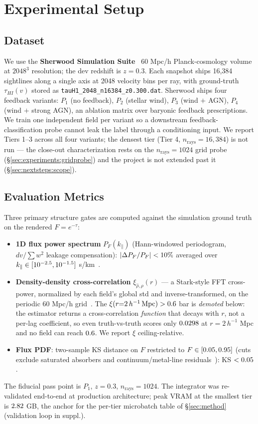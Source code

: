 \section{Experimental Setup}
\label{sec:experiments}

\subsection{Dataset}
We use the \textbf{Sherwood Simulation Suite}~\cite{bolton2017sherwood} 60 Mpc/h Planck-cosmology volume at $2048^3$ resolution; the dev redshift is $z = 0.3$. Each snapshot ships 16{,}384 sightlines along a single axis at 2048 velocity bins per ray, with ground-truth $\tau_{HI}(v)$ stored as \texttt{tauH1\_2048\_n16384\_z0.300.dat}. Sherwood ships four feedback variants: $P_1$ (no feedback), $P_2$ (stellar wind), $P_3$ (wind $+$ AGN), $P_4$ (wind $+$ strong AGN), an ablation matrix over baryonic feedback prescriptions. We train one independent field per variant so a downstream feedback-classification probe cannot leak the label through a conditioning input. We report Tiers 1--3 across all four variants; the densest tier (Tier 4, $n_{\text{rays}}=16{,}384$) is not run --- the close-out characterization rests on the $n_{\text{rays}}=1024$ grid probe (\S\ref{sec:experiments:gridprobe}) and the project is not extended past it (\S\ref{sec:nextsteps:scope}).

\subsection{Evaluation Metrics}
Three primary structure gates are computed against the simulation ground truth on the rendered $F=e^{-\tau}$:
\begin{itemize}
    \item \textbf{1D flux power spectrum} $P_F(k_\parallel)$ (Hann-windowed periodogram, $dv/\sum w^2$ leakage compensation): $|\Delta P_F / P_F| < 10\%$ averaged over $k_\parallel \in [10^{-2.5}, 10^{-1.5}]$ s/km~\cite{walther2018powerspectrum, boera2019thermal}.
    \item \textbf{Density-density cross-correlation} $\xi_{\hat\rho, \rho}(r)$ --- a Stark-style FFT cross-power, normalized by each field's global std and inverse-transformed, on the periodic 60 Mpc/h grid~\cite{lee2015, stark2015tomography}. The $\xi(r{=}2\,h^{-1}\,\text{Mpc}) > 0.6$ bar is \emph{demoted} below: the estimator returns a cross-correlation \emph{function} that decays with $r$, not a per-lag coefficient, so even truth-vs-truth scores only $0.0298$ at $r = 2\,h^{-1}$ Mpc and no field can reach $0.6$. We report $\xi$ ceiling-relative.
    \item \textbf{Flux PDF}: two-sample KS distance on $F$ restricted to $F \in [0.05, 0.95]$ (cuts exclude saturated absorbers and continuum/metal-line residuals~\cite{lee2015}): KS $< 0.05$.
\end{itemize}
The fiducial pass point is $P_1$, $z = 0.3$, $n_{\text{rays}} = 1024$. The integrator was re-validated end-to-end at production architecture; peak VRAM at the smallest tier is $2.82$ GB, the anchor for the per-tier microbatch table of \S\ref{sec:method} (validation loop in suppl.).

